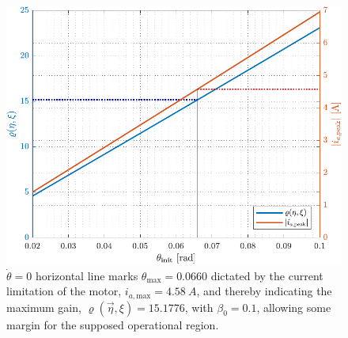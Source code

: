 %
\begin{figure}[H]
  \includegraphics[width=.75\textwidth]{figures/chooseRho}
  \caption{$\dot{\theta}=0$ horizontal line marks $\theta_\mathrm{max} = 0.0660$ dictated by the current limitation of the motor, $i_{a,\mathrm{max}} = \SI{4.58}{A}$, and thereby indicating the maximum gain, $\varrho(\vec{\eta},\xi) = 15.1776$, with $\beta_0=0.1$, allowing some margin for the supposed operational region.}
  \label{fig:chooseRho}
\end{figure}




